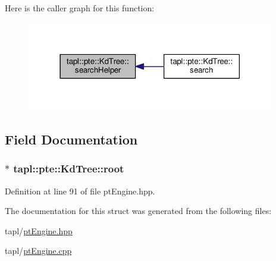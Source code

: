 Here is the caller graph for this function\+:\nopagebreak
\begin{figure}[H]
\begin{center}
\leavevmode
\includegraphics[width=306pt]{structtapl_1_1pte_1_1KdTree_a8add21f54b1f0ee01746582073e9fac5_icgraph}
\end{center}
\end{figure}




\subsection{Field Documentation}
\subsubsection[{\texorpdfstring{root}{root}}]{$\ast$ tapl\+::pte\+::\+Kd\+Tree\+::root}\hypertarget{structtapl_1_1pte_1_1KdTree_a5dd05133b3a9429ae973eda1806c05e7}{}\label{structtapl_1_1pte_1_1KdTree_a5dd05133b3a9429ae973eda1806c05e7}


Definition at line 91 of file pt\+Engine.\+hpp.



The documentation for this struct was generated from the following files\+:\begin{DoxyCompactItemize}
\item 
tapl/\hyperlink{ptEngine_8hpp}{pt\+Engine.\+hpp}\item 
tapl/\hyperlink{ptEngine_8cpp}{pt\+Engine.\+cpp}\end{DoxyCompactItemize}
